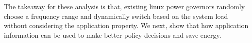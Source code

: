 The takeaway for these analysis is that, existing linux power governors randomly
choose a frequency range and dynamically switch based on the system load
without considering the application property. We next, show that how 
application information can be used to make better policy decisions and 
save energy.



